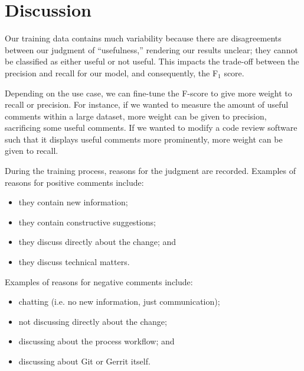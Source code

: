 \section{Discussion}

Our training data contains much variability because there are disagreements between our judgment of ``usefulness,'' rendering our results unclear; they cannot be classified as either useful or not useful.
This impacts the trade-off between the precision and recall for our model, and consequently, the F$_1$ score.

Depending on the use case, we can fine-tune the F-score to give more weight to recall or precision.
For instance, if we wanted to measure the amount of useful comments within a large dataset, more weight can be given to precision, sacrificing some useful comments.
If we wanted to modify a code review software such that it displays useful comments more prominently, more weight can be given to recall.

During the training process, reasons for the judgment are recorded. Examples of reasons for positive comments include:

\begin{itemize}
	\item they contain new information;
	\item they contain constructive suggestions;
	\item they discuss directly about the change; and
	\item they discuss technical matters.
\end{itemize}

Examples of reasons for negative comments include:

\begin{itemize}
	\item chatting (i.e. no new information, just communication);
	\item not discussing directly about the change;
	\item discussing about the process workflow; and
	\item discussing about Git or Gerrit itself.
\end{itemize}



